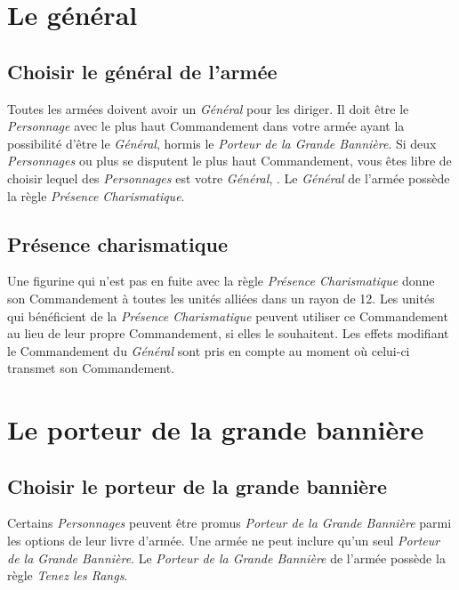 \section{Le général}

\subsection{Choisir le général de l'armée}

Toutes les armées doivent avoir un \emph{Général} pour les diriger. Il doit être le \emph{Personnage} avec le plus haut Commandement dans votre armée ayant la possibilité d'être le \emph{Général}, hormis le \emph{Porteur de la Grande Bannière}. Si deux \emph{Personnages} ou plus se disputent le plus haut Commandement, vous êtes libre de choisir lequel des \emph{Personnages} est votre \emph{Général}, . Le \emph{Général} de l'armée possède la règle \emph{Présence Charismatique}.

\subsection{Présence charismatique}

Une figurine qui n'est pas en fuite avec la règle \emph{Présence Charismatique} donne son Commandement à toutes les unités alliées dans un rayon de \unit{12}{\pouce}. Les unités qui bénéficient de la \emph{Présence Charismatique} peuvent utiliser ce Commandement au lieu de leur propre Commandement, si elles le souhaitent. Les effets modifiant le Commandement du \emph{Général} sont pris en compte au moment où celui-ci transmet son Commandement.

\section{Le porteur de la grande bannière}

\subsection{Choisir le porteur de la grande bannière}

Certains \emph{Personnages} peuvent être promus \emph{Porteur de la Grande Bannière} parmi les options de leur livre d'armée. Une armée ne peut inclure qu'un seul \emph{Porteur de la Grande Bannière}. Le \emph{Porteur de la Grande Bannière} de l'armée possède la règle \emph{Tenez les Rangs}.

